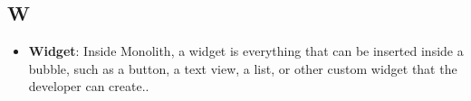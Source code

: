 \subsection*{W}
\begin{itemize}
	\item
	\textbf{Widget}: Inside Monolith, a widget is everything that can be inserted inside a bubble, such as a button, a text view, a list, or other custom widget that the developer can create..
\end{itemize}
\newpage